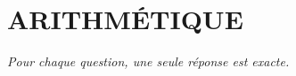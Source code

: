 
\section*{\textcolor{chapcolor}{\MakeUppercase{Arithmétique}}}

\begin{center}
\textit{Pour chaque question, une seule réponse est exacte.}
\end{center}

